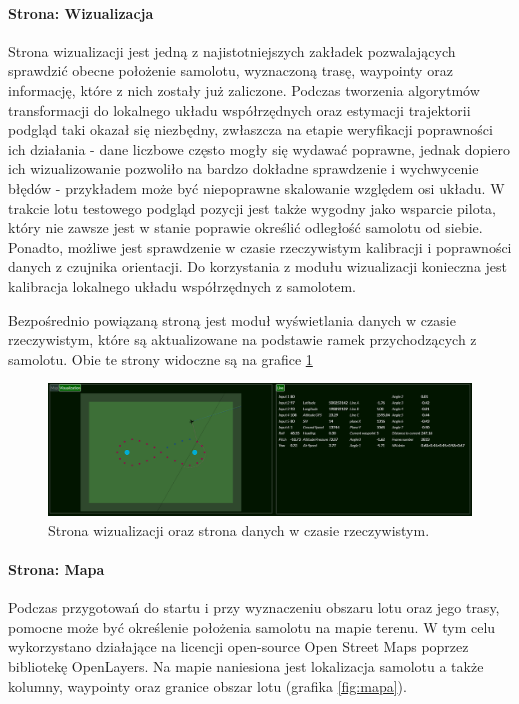 \documentclass[12pt, a4paper]{article}
\begin{document}
\FloatBarrier
 
\paragraph{Strona: Wizualizacja}\mbox{}

Strona wizualizacji jest jedną z najistotniejszych zakładek pozwalających sprawdzić obecne położenie samolotu, wyznaczoną trasę, waypointy oraz informację, które z nich zostały już zaliczone. Podczas tworzenia algorytmów transformacji do lokalnego układu współrzędnych oraz estymacji trajektorii podgląd taki okazał się niezbędny, zwłaszcza na etapie weryfikacji poprawności ich działania - dane liczbowe często mogły się wydawać poprawne, jednak dopiero ich wizualizowanie pozwoliło na bardzo dokładne sprawdzenie i wychwycenie błędów - przykładem może być niepoprawne skalowanie względem osi układu. W trakcie lotu testowego podgląd pozycji jest także wygodny jako wsparcie pilota, który nie zawsze jest w stanie poprawie określić odległość samolotu od siebie. Ponadto, możliwe jest sprawdzenie w czasie rzeczywistym kalibracji i poprawności danych z czujnika orientacji. Do korzystania z modułu wizualizacji konieczna jest kalibracja lokalnego układu współrzędnych z samolotem. 

Bezpośrednio powiązaną stroną jest moduł wyświetlania danych w czasie rzeczywistym, które są aktualizowane na podstawie ramek przychodzących z samolotu. Obie te strony widoczne są na grafice \ref{fig:wizlive}

 \begin{figure}[H]
    \centering
    \includegraphics[width=1\textwidth]{wizualizacja}
    \caption{Strona wizualizacji oraz strona danych w czasie rzeczywistym.}
    \label{fig:wizlive}
\end{figure}

\paragraph{Strona: Mapa}\mbox{}

Podczas przygotowań do startu i przy wyznaczeniu obszaru lotu oraz jego trasy, pomocne może być określenie położenia samolotu na mapie terenu. W tym celu wykorzystano działające na licencji open-source Open Street Maps poprzez bibliotekę OpenLayers. Na mapie naniesiona jest lokalizacja samolotu a także kolumny, waypointy oraz granice obszar lotu (grafika \ref{fig:mapa}).
\end{document}
